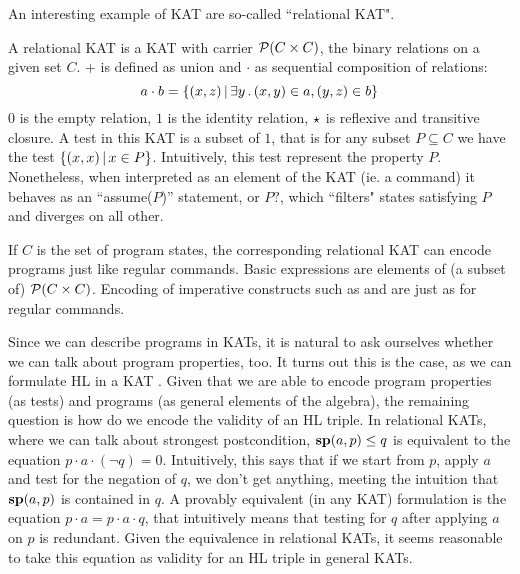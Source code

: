 An interesting example of KAT are so-called ``relational KAT".
\begin{example}
	A relational KAT is a KAT with carrier $\mathcal{P}(C \times C)$, the binary relations on a given set $C$. $+$ is defined as union and $\cdot$ as sequential composition of relations:
	\[
	a \cdot b = \{ (x, z) \,\vert\, \exists y \,.\, (x, y) \in a, (y, z) \in b \}
	\]
	$0$ is the empty relation, $1$ is the identity relation, $\star$ is reflexive and transitive closure. A test in this KAT is a subset of $1$, that is for any subset $P \subseteq C$ we have the test $\{ (x, x) \,\vert\, x \in P \}$. Intuitively, this test represent the property $P$. Nonetheless, when interpreted as an element of the KAT (ie. a command) it behaves as an ``assume($P$)'' statement, or $P ?$, which ``filters" states satisfying $P$ and diverges on all other.
\end{example}
If $C$ is the set of program states, the corresponding relational KAT can encode programs just like regular commands. Basic expressions are elements of (a subset of) $\mathcal{P}(C \times C)$. Encoding of imperative constructs such as  and  are just as for regular commands.

Since we can describe programs in KATs, it is natural to ask ourselves whether we can talk about program properties, too. It turns out this is the case, as we can formulate HL in a KAT \cite{Kozen00}. Given that we are able to encode program properties (as tests) and programs (as general elements of the algebra), the remaining question is how do we encode the validity of an HL triple. In relational KATs, where we can talk about strongest postcondition, $\textbf{sp}(a, p) \le q$ is equivalent to the equation $p \cdot a \cdot (\lnot q) = 0$. Intuitively, this says that if we start from $p$, apply $a$ and test for the negation of $q$, we don't get anything, meeting the intuition that $\textbf{sp}(a, p)$ is contained in $q$. A provably equivalent (in any KAT) formulation is the equation $p \cdot a = p \cdot a \cdot q$, that intuitively means that testing for $q$ after applying $a$ on $p$ is redundant. Given the equivalence in relational KATs, it seems reasonable to take this equation as validity for an HL triple in general KATs.


